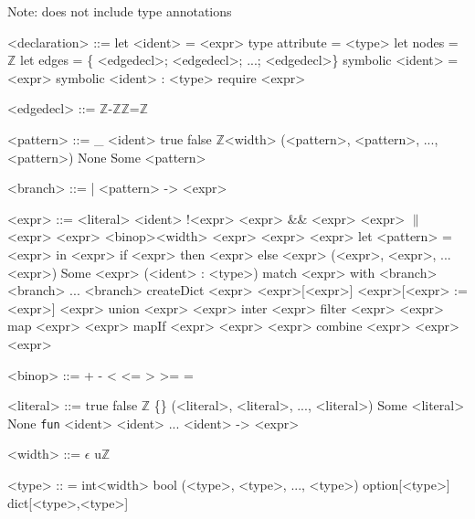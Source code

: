 \documentclass{article}
\newcommand{\Z}{\mathbb{Z}}
\newcommand{\Zt}{$\Z$}
\begin{document}
	\setlength{\grammarparsep}{20pt plus 1pt minus 1pt} %
	\setlength{\grammarindent}{12em} %
	
	Note: does not include type annotations
	\begin{grammar}
		
		<declaration> ::= 
		let <ident> = <expr>
		\alt type attribute = <type>
		\alt let nodes = \Zt
		\alt let edges = \{ <edgedecl>; <edgedecl>; ...; <edgedecl>\}
		\alt symbolic <ident> = <expr>
		\alt symbolic <ident> : <type>
		\alt require <expr>
		
		<edgedecl> ::= \Zt-\Zt \alt \Zt=\Zt
		
		<pattern> ::=
		\_
		\alt <ident>
		\alt true
		\alt false
		\alt \Zt<width>
		\alt (<pattern>, <pattern>, ..., <pattern>)
		\alt None
		\alt Some <pattern>
		
		<branch> ::= | <pattern> -> <expr>
		
		<expr> ::=
		<literal>
		\alt <ident>
		\alt !<expr>
		 \&\& <expr>
		 $\|$ <expr>
		 <binop><width> <expr>
		 <expr>
		\alt let <pattern> = <expr> in <expr>
		\alt if <expr> then <expr> else <expr>
		\alt (<expr>, <expr>, ... <expr>)
		\alt Some <expr>
		\alt (<ident> : <type>) %
		\alt match <expr> with <branch> <branch> ... <branch>
		\alt createDict <expr>
		[<expr>]
		[<expr> := <expr>]
		 union <expr>
		 inter <expr>
		\alt filter <expr> <expr>
		\alt map <expr> <expr>
		\alt mapIf <expr> <expr> <expr>
		\alt combine <expr> <expr> <expr>
		
		<binop> ::=
		+
		\alt -
		\alt \textless
		\alt \textless=
		\alt \textgreater
		\alt \textgreater=
		\alt =
		
		<literal> ::= 
		true 
		\alt false 
		\alt $\mathbb{Z}$ 
		\alt \{\} 
		\alt (<literal>, <literal>, ..., <literal>) 
		\alt Some <literal>
		\alt None
		\alt \texttt{fun} <ident> <ident> ... <ident> -> <expr>
		
		<width> ::= $\epsilon$ \alt u\Zt
		
		<type> :: = 
		int<width> 
		\alt bool 
		\alt (<type>, <type>, ..., <type>)
		\alt option[<type>]
		\alt dict[<type>,<type>]
		
	\end{grammar}
\end{document}
